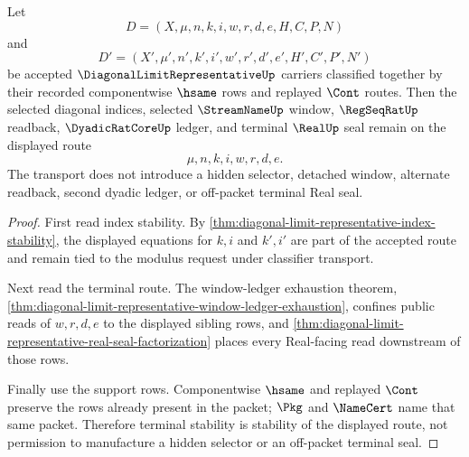 \begin{theorem}
\label{thm:diagonal-limit-representative-terminal-stability-obligation}
Let
$$
D=(X,\mu,n,k,i,w,r,d,e,H,C,P,N)
$$
and
$$
D'=(X',\mu',n',k',i',w',r',d',e',H',C',P',N')
$$
be accepted $\DiagonalLimitRepresentativeUp$ carriers classified together by their recorded componentwise $\hsame$ rows and replayed $\Cont$ routes. Then the selected diagonal indices, selected $\StreamNameUp$ window, $\RegSeqRatUp$ readback, $\DyadicRatCoreUp$ ledger, and terminal $\RealUp$ seal remain on the displayed route
$$
\mu,n,k,i,w,r,d,e.
$$
The transport does not introduce a hidden selector, detached window, alternate readback, second dyadic ledger, or off-packet terminal Real seal.
\end{theorem}
\begin{proof}
First read index stability. By \autoref{thm:diagonal-limit-representative-index-stability}, the displayed equations for $k,i$ and $k',i'$ are part of the accepted route and remain tied to the modulus request under classifier transport.

Next read the terminal route. The window-ledger exhaustion theorem, \autoref{thm:diagonal-limit-representative-window-ledger-exhaustion}, confines public reads of $w,r,d,e$ to the displayed sibling rows, and \autoref{thm:diagonal-limit-representative-real-seal-factorization} places every Real-facing read downstream of those rows.

Finally use the support rows. Componentwise $\hsame$ and replayed $\Cont$ preserve the rows already present in the packet; $\Pkg$ and $\NameCert$ name that same packet. Therefore terminal stability is stability of the displayed route, not permission to manufacture a hidden selector or an off-packet terminal seal.
\end{proof}

